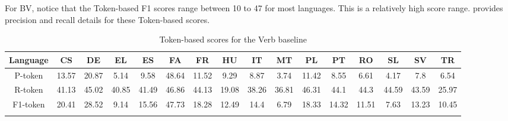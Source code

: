 \documentclass[output=paper
,modfonts
,nonflat,draftmode]{langsci/langscibook}
\begin{document}

For BV, notice that the Token-based F1 scores range between 10 to 47 for most languages. This is a relatively high score range.  provides precision and recall details for these Token-based scores. 

\begin{table}
\caption{\label{tbl:random-token-scores}Token-based scores for the Verb baseline}

{\scriptsize{}}%
\setlength\tabcolsep{2.0pt} %
\renewcommand{\arraystretch}{0.65} %
\begin{tabular}{cccccccccccccccc}
\lsptoprule
{\scriptsize{}Language} & {\scriptsize{}CS} & {\scriptsize{}DE} & {\scriptsize{}EL} & {\scriptsize{}ES} & {\scriptsize{}FA} & {\scriptsize{}FR} & {\scriptsize{}HU} & {\scriptsize{}IT} & {\scriptsize{}MT} & {\scriptsize{}PL} & {\scriptsize{}PT} & {\scriptsize{}RO} & {\scriptsize{}SL} & {\scriptsize{}SV} & {\scriptsize{}TR}\tabularnewline
\midrule
{\scriptsize{}P-token} & {\scriptsize{}13.57} & {\scriptsize{}20.87} & {\scriptsize{}5.14} & {\scriptsize{}9.58} & {\scriptsize{}48.64} & {\scriptsize{}11.52} & {\scriptsize{}9.29} & {\scriptsize{}8.87} & {\scriptsize{}3.74} & {\scriptsize{}11.42} & {\scriptsize{}8.55} & {\scriptsize{}6.61} & {\scriptsize{}4.17} & {\scriptsize{}7.8} & {\scriptsize{}6.54}\tabularnewline
\midrule
{\scriptsize{}R-token} & {\scriptsize{}41.13} & {\scriptsize{}45.02} & {\scriptsize{}40.85} & {\scriptsize{}41.49} & {\scriptsize{}46.86} & {\scriptsize{}44.13} & {\scriptsize{}19.08} & {\scriptsize{}38.26} & {\scriptsize{}36.81} & {\scriptsize{}46.31} & {\scriptsize{}44.1} & {\scriptsize{}44.3} & {\scriptsize{}44.59} & {\scriptsize{}43.59} & {\scriptsize{}25.97}\tabularnewline
\midrule
{\scriptsize{}F1-token} & {\scriptsize{}20.41} & {\scriptsize{}28.52} & {\scriptsize{}9.14} & {\scriptsize{}15.56} & {\scriptsize{}47.73} & {\scriptsize{}18.28} & {\scriptsize{}12.49} & {\scriptsize{}14.4} & {\scriptsize{}6.79} & {\scriptsize{}18.33} & {\scriptsize{}14.32} & {\scriptsize{}11.51} & {\scriptsize{}7.63} & {\scriptsize{}13.23} & {\scriptsize{}10.45}\tabularnewline
\lspbottomrule
\end{tabular}

\end{table}
\end{document}
